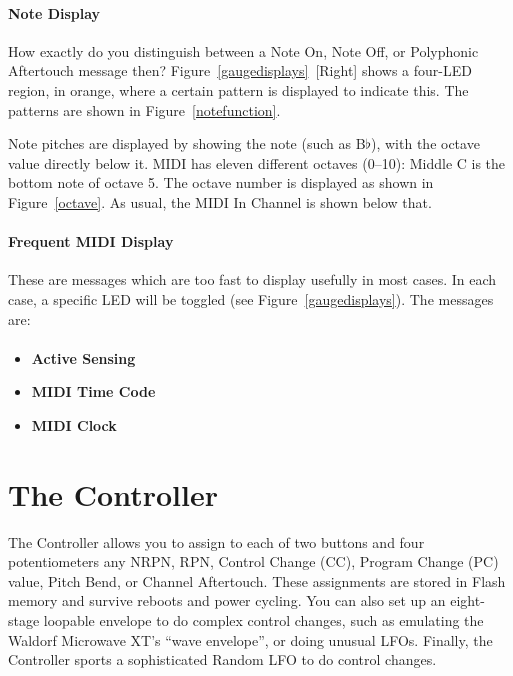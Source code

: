 \documentclass{article}
\begin{document}
\paragraph{Note Display}


How exactly do you distinguish between a Note On, Note Off, or Polyphonic Aftertouch message then?  Figure~{\ref{gaugedisplays}}~[Right] shows a four-LED region, in orange, where a certain pattern is displayed to indicate this.  The patterns are shown in Figure~\ref{notefunction}.

Note pitches are displayed by showing the note (such as B$\flat$), with the octave value directly below it.  MIDI has eleven different octaves (0--10): Middle C is the bottom note of octave 5.  The octave number is displayed as shown in Figure~\ref{octave}.  As usual, the MIDI In Channel is shown below that.


\paragraph{Frequent MIDI Display}  These are messages which are too fast to display usefully in most cases.  In each case, a specific LED will be toggled (see Figure~\ref{gaugedisplays}).  The messages are:

\paragraph{}\vspace{-2em}\begin{itemize}
\item {\bf Active Sensing}
\item {\bf MIDI Time Code}
\item {\bf MIDI Clock}
\end{itemize}


\clearpage
\section {The Controller}
\label{controller}

The Controller allows you to assign to each of two buttons and four potentiometers any NRPN, RPN, Control Change (CC), Program Change (PC) value, Pitch Bend, or Channel Aftertouch.%
These assignments are stored in Flash memory and survive reboots and power cycling.  You can also set up an eight-stage loopable envelope to do complex control changes, such as emulating the Waldorf Microwave XT's ``wave envelope'', or doing unusual LFOs.  Finally, the Controller sports a sophisticated Random LFO to do control changes.
\end{document}
